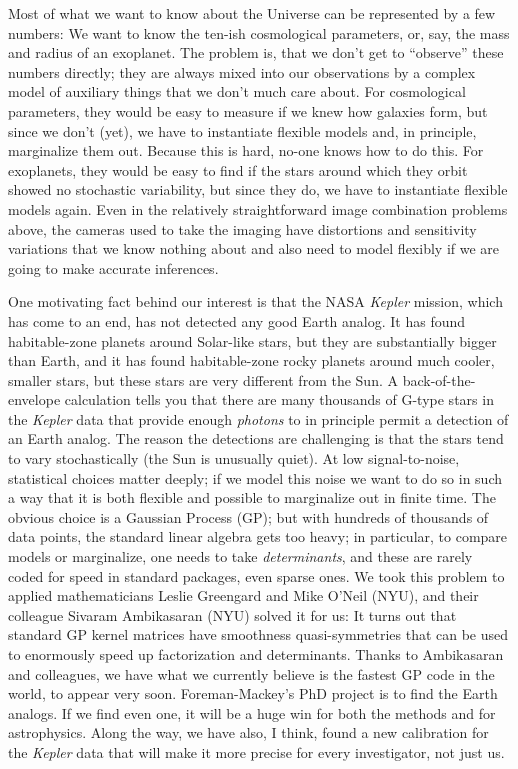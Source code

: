\documentclass[11pt, letterpaper]{article}
\begin{document}
Most of what we want to know about the Universe can be represented by a few numbers:
We want to know the ten-ish cosmological parameters, or, say, the mass and radius of an exoplanet.
The problem is, that we don't get to ``observe'' these numbers directly;
  they are always mixed into our observations by a complex model of auxiliary things that we don't much care about.
For cosmological parameters, they would be easy to measure if we knew how galaxies form,
  but since we don't (yet), we have to instantiate flexible models and, in principle, marginalize them out.
Because this is hard, no-one knows how to do this.
For exoplanets, they would be easy to find if the stars around which they orbit showed no stochastic variability,
  but since they do, we have to instantiate flexible models again.
Even in the relatively straightforward image combination problems above,
  the cameras used to take the imaging have distortions and sensitivity variations
  that we know nothing about and also need to model flexibly if we are going to make accurate inferences.

One motivating fact behind our interest is that the NASA \textsl{Kepler} mission, which has come to an end,
  has not detected any good Earth analog.
It has found habitable-zone planets around Solar-like stars,
  but they are substantially bigger than Earth,
  and it has found habitable-zone rocky planets around much cooler, smaller stars,
  but these stars are very different from the Sun.
A back-of-the-envelope calculation tells you that there are many thousands of G-type stars in the \textsl{Kepler}
  data that provide enough \emph{photons} to in principle permit a detection of an Earth analog.
The reason the detections are challenging is that the stars tend to vary stochastically (the Sun is unusually quiet).
At low signal-to-noise, statistical choices matter deeply;
  if we model this noise we want to do so in such a way that it is both flexible and possible to marginalize out in finite time.
The obvious choice is a Gaussian Process (GP); but with hundreds of thousands of data points,
  the standard linear algebra gets too heavy; in particular, to compare models or marginalize, one needs to take \emph{determinants},
  and these are rarely coded for speed in standard packages, even sparse ones.
We took this problem to applied mathematicians Leslie Greengard and Mike O'Neil (NYU),
  and their colleague Sivaram Ambikasaran (NYU) solved it for us: 
It turns out that standard GP kernel matrices have smoothness quasi-symmetries that can be used to enormously speed up
  factorization and determinants.
Thanks to Ambikasaran and colleagues,
  we have what we currently believe is the fastest GP code in the world, to appear very soon.
Foreman-Mackey's PhD project is to find the Earth analogs.
If we find even one, it will be a huge win for both the methods and for astrophysics.
Along the way, we have also, I think, found a new calibration for the \textsl{Kepler} data that will make
  it more precise for every investigator, not just us.
\end{document}
